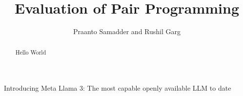 \documentclass{article}
\title{Evaluation of Pair Programming}
\author{ Praanto Samadder and Rushil Garg }
\begin{document}
\maketitle
\begin{abstract}
    Hello World
\end{abstract}








\begin{thebibliography}{1000}
    Introducing Meta Llama 3: The most capable openly available LLM to date
\end{thebibliography}
\end{document}
